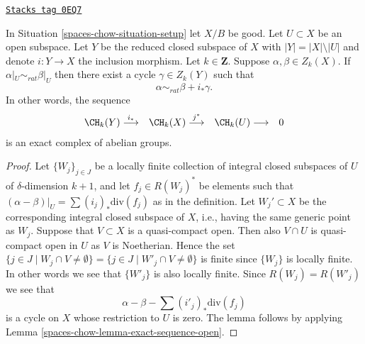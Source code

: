 \begin{lemma}
\label{spaces-chow-lemma-restrict-to-open}
\href{https://stacks.math.columbia.edu/tag/0EQ7}{\texttt{Stacks tag 0EQ7}}

In Situation \ref{spaces-chow-situation-setup} let $X/B$ be good.
Let $U \subset X$ be an open subspace. Let $Y$ be the
reduced closed subspace of $X$ with $|Y| = |X| \setminus |U|$
and denote $i : Y \to X$ the inclusion morphism. Let $k \in \mathbf{Z}$.
Suppose $\alpha, \beta \in Z_k(X)$. If $\alpha|_U \sim_{rat} \beta|_U$
then there exist a cycle $\gamma \in Z_k(Y)$ such that
$$
\alpha \sim_{rat} \beta + i_*\gamma.
$$
In other words, the sequence
$$
\begin{array}{cccc}\CH_k(Y) \overset{i_*}{\longrightarrow} & \CH_k(X) \overset{j^*}{\longrightarrow} & \CH_k(U) \longrightarrow & 0\end{array}
$$
is an exact complex of abelian groups.
\end{lemma}

\begin{proof}
Let $\{W_j\}_{j \in J}$ be a locally finite collection of integral closed
subspaces of $U$ of $\delta$-dimension $k + 1$, and let $f_j \in R(W_j)^*$
be elements such that $(\alpha - \beta)|_U = \sum (i_j)_*\text{div}(f_j)$
as in the definition. Let $W_j' \subset X$ be the corresponding integral
closed subspace of $X$, i.e., having the same generic point as $W_j$.
Suppose that $V \subset X$ is a quasi-compact open.
Then also $V \cap U$ is quasi-compact open in $U$ as $V$ is Noetherian.
Hence the set $\{j \in J \mid W_j \cap V \not = \emptyset\}
= \{j \in J \mid W'_j \cap V \not = \emptyset\}$
is finite since $\{W_j\}$ is locally finite. In other words we see that
$\{W'_j\}$ is also locally finite. Since $R(W_j) = R(W'_j)$ we see
that
$$
\alpha - \beta - \sum (i'_j)_*\text{div}(f_j)
$$
is a cycle on $X$ whose restriction to $U$ is zero.
The lemma follows by applying Lemma \ref{spaces-chow-lemma-exact-sequence-open}.
\end{proof}

